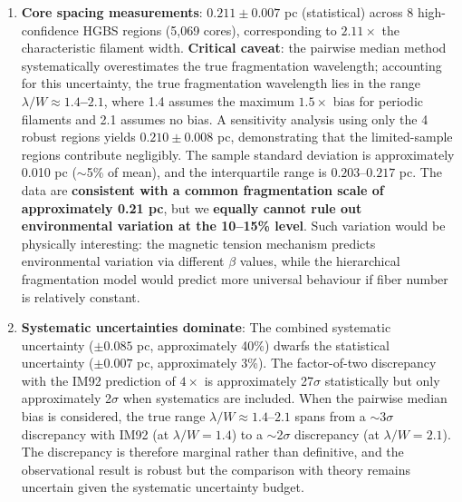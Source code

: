 \documentclass[11pt,a4paper]{article}
\begin{document}
\begin{enumerate}
    \item \textbf{Core spacing measurements}: $0.211 \pm 0.007$ pc (statistical) across 8 high-confidence HGBS regions (5,069 cores), corresponding to $2.11\times$ the characteristic filament width. \textbf{Critical caveat}: the pairwise median method systematically overestimates the true fragmentation wavelength; accounting for this uncertainty, the true fragmentation wavelength lies in the range \textbf{$\lambda/W \approx 1.4$--$2.1$}, where 1.4 assumes the maximum $1.5\times$ bias for periodic filaments and 2.1 assumes no bias. A sensitivity analysis using only the 4 robust regions yields $0.210 \pm 0.008$ pc, demonstrating that the limited-sample regions contribute negligibly. The sample standard deviation is approximately 0.010 pc ($\sim$5\% of mean), and the interquartile range is $0.203$--$0.217$ pc. The data are \textbf{consistent with a common fragmentation scale of approximately 0.21 pc}, but we \textbf{equally cannot rule out environmental variation at the 10--15\% level}. Such variation would be physically interesting: the magnetic tension mechanism predicts environmental variation via different $\beta$ values, while the hierarchical fragmentation model would predict more universal behaviour if fiber number is relatively constant.

    \item \textbf{Systematic uncertainties dominate}: The combined systematic uncertainty ($\pm0.085$ pc, approximately 40\%) dwarfs the statistical uncertainty ($\pm0.007$ pc, approximately 3\%). The factor-of-two discrepancy with the IM92 prediction of $4\times$ is approximately 27$\sigma$ statistically but only approximately 2$\sigma$ when systematics are included. When the pairwise median bias is considered, the true range $\lambda/W \approx 1.4$--$2.1$ spans from a $\sim$3$\sigma$ discrepancy with IM92 (at $\lambda/W = 1.4$) to a $\sim$2$\sigma$ discrepancy (at $\lambda/W = 2.1$). The discrepancy is therefore marginal rather than definitive, and the observational result is robust but the comparison with theory remains uncertain given the systematic uncertainty budget.


\end{enumerate}
\end{document}
